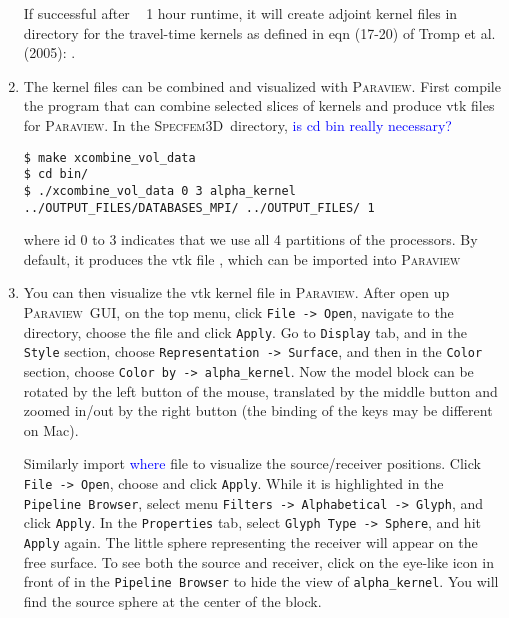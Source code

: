 \documentclass[10pt,fleqn,letterpaper]{article}
\newcommand{\specfem}{\textsc{Specfem3D}}
\newcommand{\paraview}{\textsc{Paraview}}
\newcommand{\blue}[1]{\textcolor{blue}{#1}}
\begin{document}
\begin{enumerate}
If successful after ~ 1 hour runtime, it will create adjoint kernel files in directory  for the travel-time kernels as defined in eqn (17-20) of Tromp et al. (2005): .

\item The kernel files can be combined and visualized with \paraview. First compile the program that can combine selected slices of kernels and produce vtk files for \paraview. In the \specfem\ directory, \blue{is cd bin really necessary?}
\begin{lstlisting}
$ make xcombine_vol_data
$ cd bin/ 
$ ./xcombine_vol_data 0 3 alpha_kernel ../OUTPUT_FILES/DATABASES_MPI/ ../OUTPUT_FILES/ 1
\end{lstlisting}
where id 0 to 3 indicates that we use all 4 partitions of the processors. By default, it produces the vtk file , which can be imported into \paraview

\item You can then visualize the vtk kernel file in \paraview. After open up \paraview\ GUI, on the top menu, click \verb+File -> Open+, navigate to the  directory, choose the  file and click \verb+Apply+. Go to \verb+Display+ tab, and in the \verb+Style+ section, choose \verb+Representation -> Surface+, and then in the \verb+Color+ section, choose \verb+Color by -> alpha_kernel+. Now the model block can be rotated by the left button of the mouse, translated by the middle button and zoomed in/out by the right button (the binding of the keys may be different on Mac).

   Similarly import  \blue{where} file to visualize the source/receiver positions. Click \verb+File -> Open+, choose  and click \verb+Apply+. While it is highlighted in the \verb+Pipeline Browser+, select menu \verb+Filters -> Alphabetical -> Glyph+, and click \verb+Apply+. In the \verb+Properties+ tab, select \verb+Glyph Type -> Sphere+, and hit \verb+Apply+ again. The little sphere representing the receiver will appear on the free surface. To see both the source and receiver, click on the eye-like icon in front of  in the \verb+Pipeline Browser+ to hide the view of \verb+alpha_kernel+. You will find the source sphere at the center of the block.


\end{enumerate}
\end{document}
